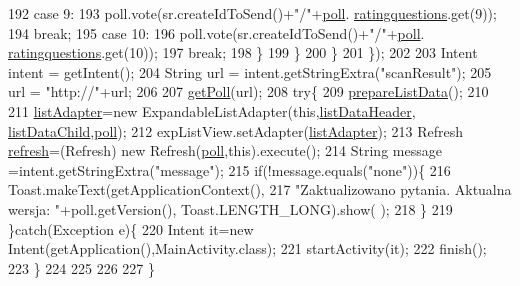 \begin{DoxyCode}
192                     \textcolor{keywordflow}{case} 9:
193                         poll.vote(sr.createIdToSend()+\textcolor{stringliteral}{"/"}+\hyperlink{classcom_1_1example_1_1qrpoll_1_1_poll_activity_accbd807fe57852d64377c5a96401c376}{poll}.
      \hyperlink{classcom_1_1example_1_1qrpoll_1_1_poll_a357dc2acb9f42f2bee8dd88556551637}{ratingquestions}.get(9));
194                         \textcolor{keywordflow}{break};
195                     \textcolor{keywordflow}{case} 10:
196                         poll.vote(sr.createIdToSend()+\textcolor{stringliteral}{"/"}+\hyperlink{classcom_1_1example_1_1qrpoll_1_1_poll_activity_accbd807fe57852d64377c5a96401c376}{poll}.
      \hyperlink{classcom_1_1example_1_1qrpoll_1_1_poll_a357dc2acb9f42f2bee8dd88556551637}{ratingquestions}.get(10));
197                         \textcolor{keywordflow}{break};
198                     \}   
199                 \}
200             \}
201         \});
202         
203         Intent intent = getIntent();
204         String url = intent.getStringExtra(\textcolor{stringliteral}{"scanResult"});
205         url = \textcolor{stringliteral}{"http://"}+url;
206         
207         \hyperlink{classcom_1_1example_1_1qrpoll_1_1_poll_activity_aa474b030c95c180e2ac43c778c5e0fc9}{getPoll}(url);
208         \textcolor{keywordflow}{try}\{
209         \hyperlink{classcom_1_1example_1_1qrpoll_1_1_poll_activity_a1081f69211873eaf38c422ea12c769f0}{prepareListData}();
210     
211         \hyperlink{classcom_1_1example_1_1qrpoll_1_1_poll_activity_aeedb4d35f1bb56db80b834a5c5da4f44}{listAdapter}=\textcolor{keyword}{new} ExpandableListAdapter(\textcolor{keyword}{this},\hyperlink{classcom_1_1example_1_1qrpoll_1_1_poll_activity_a62dde3c117f038e463aa7174906f5f7b}{listDataHeader},
      \hyperlink{classcom_1_1example_1_1qrpoll_1_1_poll_activity_ab607bec81e729232d72cee9db8ffdc73}{listDataChild},\hyperlink{classcom_1_1example_1_1qrpoll_1_1_poll_activity_accbd807fe57852d64377c5a96401c376}{poll});
212         expListView.setAdapter(\hyperlink{classcom_1_1example_1_1qrpoll_1_1_poll_activity_aeedb4d35f1bb56db80b834a5c5da4f44}{listAdapter});
213         Refresh \hyperlink{classcom_1_1example_1_1qrpoll_1_1_poll_activity_a6c59d6b3beb1d5fea9899b0b0cb51e1f}{refresh}=(Refresh) \textcolor{keyword}{new} Refresh(\hyperlink{classcom_1_1example_1_1qrpoll_1_1_poll_activity_accbd807fe57852d64377c5a96401c376}{poll},\textcolor{keyword}{this}).execute();
214         String message =intent.getStringExtra(\textcolor{stringliteral}{"message"});
215         \textcolor{keywordflow}{if}(!message.equals(\textcolor{stringliteral}{"none"}))\{
216             Toast.makeText(getApplicationContext(),
217                     \textcolor{stringliteral}{"Zaktualizowano pytania. Aktualna wersja: "}+poll.getVersion(), Toast.LENGTH\_LONG).show(
      );
218         \}
219         \}\textcolor{keywordflow}{catch}(Exception e)\{
220             Intent it=\textcolor{keyword}{new} Intent(getApplication(),MainActivity.class);
221             startActivity(it);
222             finish();
223         \}
224     
225         
226         
227     \}
\end{DoxyCode}


